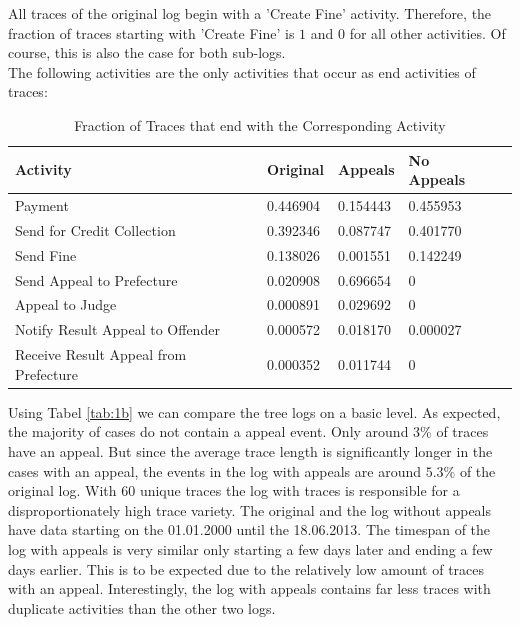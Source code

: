 \documentclass[12pt]{report}
\begin{document}
All traces of the original log begin with a 'Create Fine' activity. Therefore, the fraction of traces starting with 'Create Fine' is $1$ and $0$ for all other activities. Of course, this is also the case for both sub-logs. \\
The following activities are the only activities that occur as end activities of traces:

\begin{table}[H]
\centering
\begin{tabular}{|l|l|l|l|l|}
\hline \textbf{Activity} & \textbf{Original} & \textbf{Appeals} & \textbf{No Appeals} \\
\hline Payment  & 0.446904 & 0.154443 & 0.455953\\
\hline Send for Credit Collection & 0.392346 & 0.087747 & 0.401770\\
\hline Send Fine  & 0.138026 & 0.001551 & 0.142249\\
\hline Send Appeal to Prefecture  & 0.020908 & 0.696654 & 0\\
\hline Appeal to Judge & 0.000891 & 0.029692 &0\\
\hline Notify Result Appeal to Offender & 0.000572 & 0.018170 & 0.000027\\
\hline Receive Result Appeal from Prefecture & 0.000352 & 0.011744 & 0\\
\hline
\end{tabular}
\caption{Fraction of Traces that end with the Corresponding Activity}
\label{tab:1c_end}
\end{table}

Using Tabel \ref{tab:1b} we can compare the tree logs on a basic level. As expected, the majority of
cases do not contain a appeal event. Only around $3\%$ of traces have an appeal. But since the average trace length is
significantly longer in the cases with an appeal, the events in the log with appeals are around $5.3\%$ of the original log.
With 60 unique traces the log with traces is responsible for a disproportionately high trace variety. The original and the log
without appeals have data starting on the 01.01.2000 until the 18.06.2013. The timespan of the log with appeals is very similar
only starting a few days later and ending a few days earlier. This is to be expected due to the relatively low amount of traces
with an appeal. Interestingly, the log with appeals contains far less traces with duplicate activities than the other two logs. \\
\end{document}
